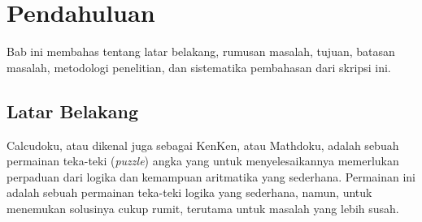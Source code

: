 \chapter{Pendahuluan}
\label{chap:pendahuluan}

Bab ini membahas tentang latar belakang, rumusan masalah, tujuan, batasan masalah, metodologi penelitian, dan sistematika pembahasan dari skripsi ini.

\section{Latar Belakang}
\label{sec:latarbelakang}
Calcudoku, atau dikenal juga sebagai KenKen, atau Mathdoku, adalah sebuah permainan teka-teki (\textit{puzzle}) angka yang untuk menyelesaikannya memerlukan perpaduan dari logika dan kemampuan aritmatika yang sederhana. Permainan ini adalah sebuah permainan teka-teki logika yang sederhana, namun, untuk menemukan solusinya cukup rumit, terutama untuk masalah yang lebih susah.


